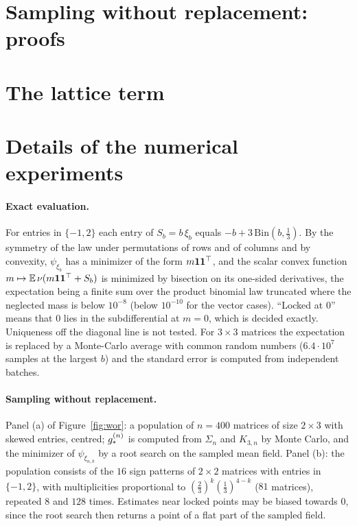 \documentclass[anon,12pt]{colt2026}
\begin{document}
\section{Sampling without replacement: proofs}\label{app:wor}


\section{The lattice term}\label{app:lattice}


\section{Details of the numerical experiments}\label{app:exp}

\paragraph{Exact evaluation.} For entries in $\{-1,2\}$ each entry of $S_b=b\,\xi_b$ equals $-b+3\,\mathrm{Bin}(b,\frac13)$.
By the symmetry of the law under permutations of rows and of columns and by convexity, $\psi_{\xi_b}$ has a minimizer of the form
$m\mathbf{1}\mathbf{1}^\top$, and the scalar convex function $m\mapsto\mathbb{E}\,\nu(m\mathbf{1}\mathbf{1}^\top+S_b)$ is minimized by bisection on its
one-sided derivatives, the expectation being a finite sum over the product binomial law truncated where the neglected
mass is below $10^{-8}$ (below $10^{-10}$ for the vector cases). ``Locked at $0$'' means that $0$ lies in the
subdifferential at $m=0$, which is decided exactly. Uniqueness off the diagonal line is not tested. For $3\times3$
matrices the expectation is replaced by a Monte-Carlo average with common random numbers ($6.4\cdot10^7$ samples at the
largest $b$) and the standard error is computed from independent batches.

\paragraph{Sampling without replacement.} Panel (a) of Figure~\ref{fig:wor}: a population of $n=400$ matrices of size
$2\times3$ with skewed entries, centred; $g_\ast^{(n)}$ is computed from $\Sigma_n$ and $K_{3,n}$ by Monte Carlo, and the
minimizer of $\psi_{\xi_{n,b}}$ by a root search on the sampled mean field. Panel (b): the population consists of the
$16$ sign patterns of $2\times2$ matrices with entries in $\{-1,2\}$, with multiplicities proportional to
$(\frac23)^k(\frac13)^{4-k}$ ($81$ matrices), repeated $8$ and $128$ times. Estimates near locked points may be biased
towards $0$, since the root search then returns a point of a flat part of the sampled field.
\end{document}
